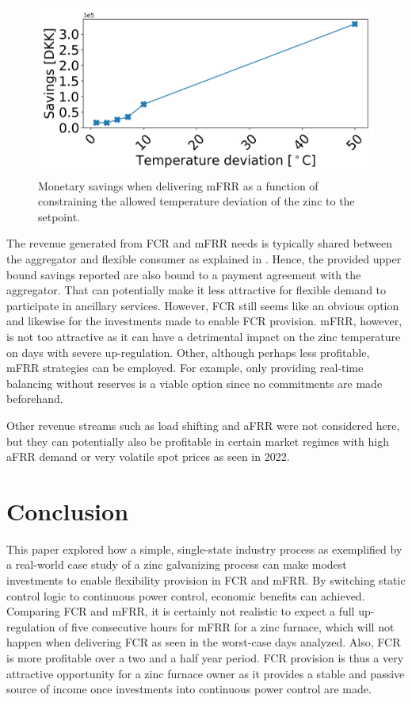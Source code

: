 \documentclass[sigconf]{acmart}
\begin{document}
\begin{figure}[t]
    \centering
    \includegraphics[width=\columnwidth]{figures/profit_vs_delta_temp_mfrr_and_energy.png}
    \caption{Monetary savings when delivering mFRR as a function of constraining the allowed temperature deviation of the zinc to the setpoint.}
    \label{fig:profit_vs_delta_temp_mfrr}
\end{figure}


The revenue generated from FCR and mFRR needs is typically shared between the aggregator and flexible consumer as explained in \cite{gade2022ecosystem}. Hence, the provided upper bound savings reported are also bound to a payment agreement with the aggregator. That can potentially make it less attractive for flexible demand to participate in ancillary services. However, FCR still seems like an obvious option and likewise for the investments made to enable FCR provision. mFRR, however, is not too attractive as it can have a detrimental impact on the zinc temperature on days with severe up-regulation. Other, although perhaps less profitable, mFRR strategies can be employed. For example, only providing real-time balancing without reserves is a viable option since no commitments are made beforehand.

Other revenue streams such as load shifting and aFRR were not considered here, but they can potentially also be profitable in certain market regimes with high aFRR demand or very volatile spot prices as seen in 2022.

\section{Conclusion}

This paper explored how a simple, single-state industry process as exemplified by a real-world case study of a zinc galvanizing process can make modest investments to enable flexibility provision in FCR and mFRR. By switching static control logic to continuous power control, economic benefits can achieved. Comparing FCR and mFRR, it is certainly not realistic to expect a full up-regulation of five consecutive hours for mFRR for a zinc furnace, which will not happen when delivering FCR as seen in the worst-case days analyzed. Also, FCR is more profitable over a two and a half year period. FCR provision is thus a very attractive opportunity for a zinc furnace owner as it provides a stable and passive source of income once investments into continuous power control are made.
\end{document}
